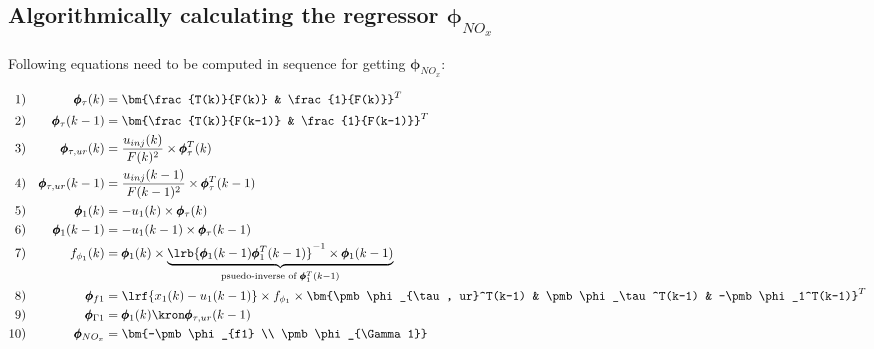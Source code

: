 \subsection{Algorithmically calculating the regressor $\pmb \phi_{NO_x}$}

Following equations need to be computed in sequence for getting $\pmb \phi_{NO_x}$:


\begin{align*}
        1)&& \pmb \phi_\tau(k) &= \bm{\frac{T(k)}{F(k)} & \frac{1}{F(k)}}^T \\
        2)&& \pmb \phi_\tau(k-1)&= \bm{\frac{T(k)}{F(k-1)} & \frac{1}{F(k-1)}}^T \\
        3)&& \pmb \phi_{\tau, ur}(k)&= \frac{u_{inj}(k)}{F(k)^2} \times \pmb \phi_\tau^T(k) \\
        4)&& \pmb \phi_{\tau, ur}(k-1)&= \frac{u_{inj}(k-1)}{F(k-1)^2} \times \pmb \phi_\tau^T(k-1) \\
        5)&& \pmb \phi_1(k) &= -u_1(k) \times \pmb \phi_\tau(k)\\
        6)&& \pmb \phi_1(k-1) &= -u_1(k-1) \times \pmb \phi_\tau(k-1) \\
        7)&& f_{\phi_1}(k) &= \pmb \phi_1(k) \times \underbrace{\lrb{\pmb \phi_1(k-1) \pmb \phi_1^T(k-1)}^{-1} \times \pmb \phi_1(k-1)}_{\text{psuedo-inverse of } \pmb \phi_1^T(k-1)}\\
        8)&& \pmb \phi_{f1} &= \lrf{x_1(k) - u_1(k-1)} \times f_{\phi_1} \times
                                \bm{\pmb \phi_{\tau, ur}^T(k-1) & \pmb \phi_\tau^T(k-1) & -\pmb \phi_1^T(k-1)}^T\\
        9)&& \pmb \phi_{\Gamma 1} &= \pmb \phi_1 (k) \kron \pmb \phi_{\tau, ur} (k-1) \\
        10)&& \pmb \phi_{NO_x} &= \bm{-\pmb \phi_{f1} \\ \pmb \phi_{\Gamma 1}}
\end{align*}

